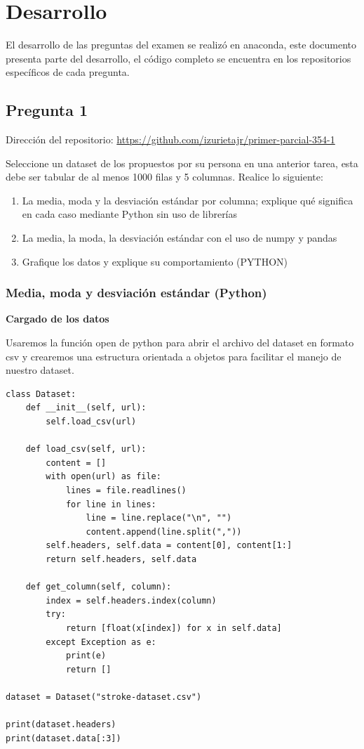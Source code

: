 \documentclass[letter]{article}
\begin{document}
\section{Desarrollo}
\label{sec:org5877377}

El desarrollo de las preguntas del examen se realizó en anaconda, este documento
presenta parte del desarrollo, el código completo se encuentra en los
repositorios específicos de cada pregunta.

\subsection{Pregunta 1}
\label{sec:org2bf42d2}

Dirección del repositorio: \url{https://github.com/izurietajr/primer-parcial-354-1}

Seleccione un dataset de los propuestos por su persona en una anterior tarea, esta debe ser tabular de al menos 1000 filas y 5 columnas. Realice lo siguiente:

\begin{enumerate}
\item La media, moda y la desviación estándar por columna; explique qué significa en cada caso mediante Python sin uso de librerías
\item La media, la moda, la desviación estándar con el uso de numpy y pandas
\item Grafique los datos y explique su comportamiento (PYTHON)
\end{enumerate}

\subsubsection{Media, moda y desviación estándar (Python)}
\label{sec:org5f37919}

\textbf{Cargado de los datos}

Usaremos la función open de python para abrir el archivo del dataset en formato csv y crearemos una estructura orientada a objetos para facilitar el manejo de nuestro dataset.

\begin{verbatim}
class Dataset:
    def __init__(self, url):
        self.load_csv(url)

    def load_csv(self, url):
        content = []
        with open(url) as file:
            lines = file.readlines()
            for line in lines:
                line = line.replace("\n", "")
                content.append(line.split(","))
        self.headers, self.data = content[0], content[1:]
        return self.headers, self.data

    def get_column(self, column):
        index = self.headers.index(column)
        try:
            return [float(x[index]) for x in self.data]
        except Exception as e:
            print(e)
            return []

dataset = Dataset("stroke-dataset.csv")

print(dataset.headers)
print(dataset.data[:3])
\end{verbatim}
\end{document}
